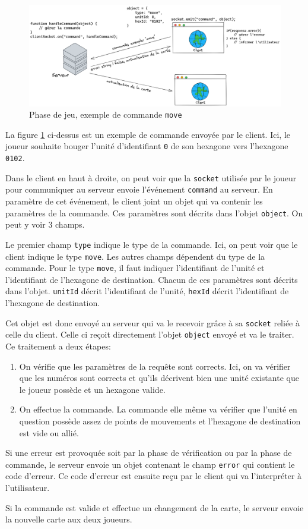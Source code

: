 \begin{figure}[H]
    \centering
    \includegraphics[scale=0.25]{data/reseau_commande.png}
    \caption{Phase de jeu, exemple de commande {\tt move}}
    \label{reseau_commande}
\end{figure}

La figure \ref{reseau_commande} ci-dessus est un exemple de commande envoyée par le client.
Ici, le joueur souhaite bouger l'unité d'identifiant {\tt 0} de son hexagone vers l'hexagone {\tt 0102}.

Dans le client en haut à droite, on peut voir que la {\tt socket} utilisée par le joueur pour communiquer au serveur
envoie l'événement {\tt command} au serveur. En paramètre de cet événement, le client joint un objet qui va contenir les
paramètres de la commande. Ces paramètres sont décrits dans l'objet {\tt object}. On peut y voir 3 champs.

Le premier champ {\tt type} indique le type de la commande. Ici, on peut voir que le client indique le type {\tt move}.
Les autres champs dépendent du type de la commande. Pour le type {\tt move}, il faut indiquer l'identifiant de l'unité et
l'identifiant de l'hexagone de destination.
Chacun de ces paramètres sont décrits dans l'objet. {\tt unitId} décrit l'identifiant de l'unité, {\tt hexId} décrit l'identifiant
de l'hexagone de destination.

Cet objet est donc envoyé au serveur qui va le recevoir grâce à sa {\tt socket} reliée à celle du client.
Celle ci reçoit directement l'objet {\tt object} envoyé et va le traiter.
Ce traitement a deux étapes:
\begin{enumerate}
    \item On vérifie que les paramètres de la requête sont corrects. Ici, on va vérifier que les numéros sont corrects
          et qu'ils décrivent bien une unité existante que le joueur possède et un hexagone valide.
    \item On effectue la commande. La commande elle même va vérifier que l'unité en question possède assez de points de mouvements et l'hexagone de destination est vide ou allié.
\end{enumerate}


Si une erreur est provoquée soit par la phase de vérification ou par la phase de commande, le serveur envoie un objet contenant le champ {\tt error} qui contient le code d'erreur.
Ce code d'erreur est ensuite reçu par le client qui va l'interpréter à l'utilisateur.

Si la commande est valide et effectue un changement de la carte, le serveur envoie la nouvelle carte aux deux joueurs.
